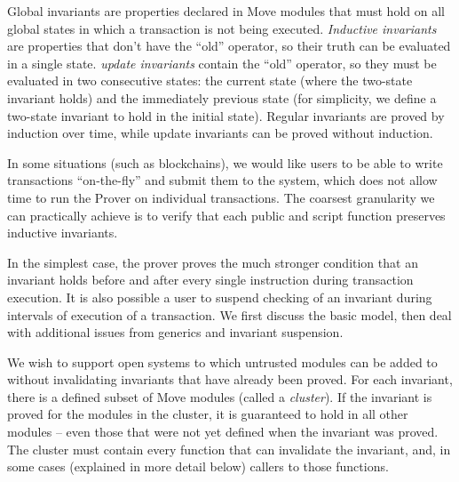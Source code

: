 \label{sec:GlobalInvariants}



Global invariants are properties declared in Move modules
that must hold on all global states
in which a transaction is not being executed.
\textit{Inductive invariants} are properties that don't have the
``old'' operator, so their truth can be evaluated in a single state.
\textit{update invariants} contain the ``old'' operator, so they
must be evaluated in two consecutive states: the current state (where
the two-state invariant holds) and the immediately previous state
(for simplicity, we define a two-state invariant to hold in the initial state).
Regular invariants are proved by induction over time, while update
invariants can be proved without induction.

In some situations (such as blockchains), we would like
users to be able to write transactions ``on-the-fly'' and submit
them to the system, which does not allow time to run the Prover
on individual transactions. The coarsest granularity we can
practically achieve is to verify that each public and script function preserves
inductive invariants.

In the simplest case, the
prover proves the much stronger condition that an invariant holds
before and after every single instruction during transaction
execution.  It is also possible a user to suspend checking of an
invariant during intervals of execution of a transaction. We first
discuss the basic model, then deal with additional issues from generics
and invariant suspension.

We wish to support open systems to which untrusted modules can be
added to without invalidating invariants that have already been
proved.  For each invariant, there is a defined subset of Move modules
(called a \textit{cluster}).  If the invariant is proved for the
modules in the cluster, it is guaranteed to hold in all other modules
-- even those that were not yet defined when the invariant was proved.
The cluster must contain every function that can invalidate the invariant,
and, in some cases (explained in more detail below) callers to those
functions.



